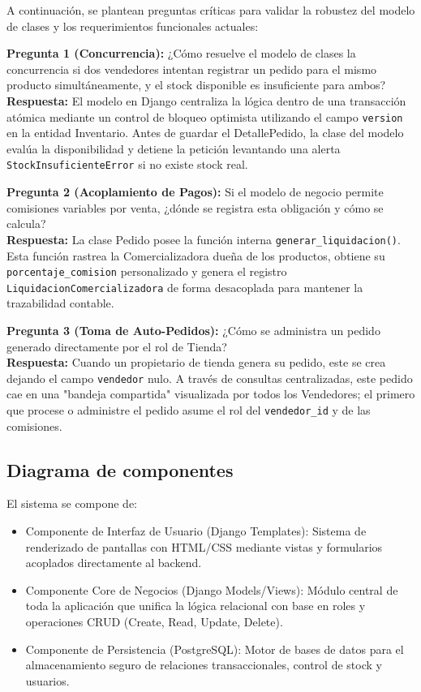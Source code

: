 \documentclass{article}
\begin{document}
A continuación, se plantean preguntas críticas para validar la robustez del modelo de clases y los requerimientos funcionales actuales: 

\textbf{Pregunta 1 (Concurrencia):} ¿Cómo resuelve el modelo de clases la concurrencia si dos vendedores intentan registrar un pedido para el mismo producto simultáneamente, y el stock disponible es insuficiente para ambos?  \\
\textbf{Respuesta:} El modelo en Django centraliza la lógica dentro de una transacción atómica mediante un control de bloqueo optimista utilizando el campo \texttt{version} en la entidad Inventario. Antes de guardar el DetallePedido, la clase del modelo evalúa la disponibilidad y detiene la petición levantando una alerta \texttt{StockInsuficienteError} si no existe stock real. 

\textbf{Pregunta 2 (Acoplamiento de Pagos):} Si el modelo de negocio permite comisiones variables por venta, ¿dónde se registra esta obligación y cómo se calcula?  \\
\textbf{Respuesta:} La clase Pedido posee la función interna \texttt{generar\_liquidacion()}. Esta función rastrea la Comercializadora dueña de los productos, obtiene su \texttt{porcentaje\_comision} personalizado y genera el registro \texttt{LiquidacionComercializadora} de forma desacoplada para mantener la trazabilidad contable.

\textbf{Pregunta 3 (Toma de Auto-Pedidos):} ¿Cómo se administra un pedido generado directamente por el rol de Tienda? \\
\textbf{Respuesta:} Cuando un propietario de tienda genera su pedido, este se crea dejando el campo \texttt{vendedor} nulo. A través de consultas centralizadas, este pedido cae en una "bandeja compartida" visualizada por todos los Vendedores; el primero que procese o administre el pedido asume el rol del \texttt{vendedor\_id} y de las comisiones.

\subsection{Diagrama de componentes} 
El sistema se compone de: 
\begin{itemize}
    \item Componente de Interfaz de Usuario (Django Templates): Sistema de renderizado de pantallas con HTML/CSS mediante vistas y formularios acoplados directamente al backend. 
    \item Componente Core de Negocios (Django Models/Views): Módulo central de toda la aplicación que unifica la lógica relacional con base en roles y operaciones CRUD (Create, Read, Update, Delete). 
    \item Componente de Persistencia (PostgreSQL): Motor de bases de datos para el almacenamiento seguro de relaciones transaccionales, control de stock y usuarios. 
\end{itemize}
\end{document}
